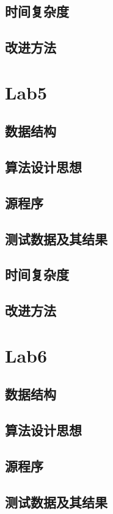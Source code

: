 \documentclass[a4paper,11pt,UTF8]{ctexart}
\begin{document}
\subsection{时间复杂度}
\subsection{改进方法}

\section{Lab5}
\subsection{数据结构}
\subsection{算法设计思想}
\subsection{源程序}
\subsection{测试数据及其结果}
\subsection{时间复杂度}
\subsection{改进方法}

\section{Lab6}
\subsection{数据结构}
\subsection{算法设计思想}
\subsection{源程序}
\subsection{测试数据及其结果}
\end{document}
